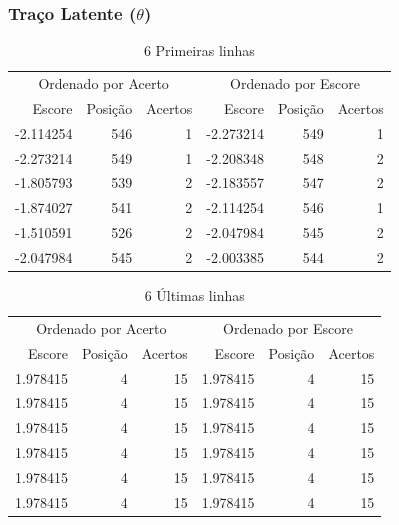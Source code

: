 \documentclass[]{article}
\begin{document}
\subsubsection{\texorpdfstring{Traço Latente
(\(\theta\))}{Traço Latente (\textbackslash{}theta)}}\label{traco-latente-theta}

\begin{table}[!h]

\caption{\label{tab:tab-traço-latente1}6 Primeiras linhas}
\centering
\begin{tabular}[t]{rrrrrr}
\toprule
\multicolumn{3}{c}{Ordenado por Acerto} & \multicolumn{3}{c}{Ordenado por Escore} \\
\cmidrule(l{2pt}r{2pt}){1-3} \cmidrule(l{2pt}r{2pt}){4-6}
Escore & Posição & Acertos & Escore & Posição & Acertos\\
\midrule
-2.114254 & 546 & 1 & -2.273214 & 549 & 1\\
-2.273214 & 549 & 1 & -2.208348 & 548 & 2\\
-1.805793 & 539 & 2 & -2.183557 & 547 & 2\\
-1.874027 & 541 & 2 & -2.114254 & 546 & 1\\
-1.510591 & 526 & 2 & -2.047984 & 545 & 2\\
-2.047984 & 545 & 2 & -2.003385 & 544 & 2\\
\bottomrule
\end{tabular}
\end{table}

\begin{table}[!h]

\caption{\label{tab:tab-traço-latente2}6 Últimas linhas}
\centering
\begin{tabular}[t]{rrrrrr}
\toprule
\multicolumn{3}{c}{Ordenado por Acerto} & \multicolumn{3}{c}{Ordenado por Escore} \\
\cmidrule(l{2pt}r{2pt}){1-3} \cmidrule(l{2pt}r{2pt}){4-6}
Escore & Posição & Acertos & Escore & Posição & Acertos\\
\midrule
1.978415 & 4 & 15 & 1.978415 & 4 & 15\\
1.978415 & 4 & 15 & 1.978415 & 4 & 15\\
1.978415 & 4 & 15 & 1.978415 & 4 & 15\\
1.978415 & 4 & 15 & 1.978415 & 4 & 15\\
1.978415 & 4 & 15 & 1.978415 & 4 & 15\\
1.978415 & 4 & 15 & 1.978415 & 4 & 15\\
\bottomrule
\end{tabular}
\end{table}
\end{document}
